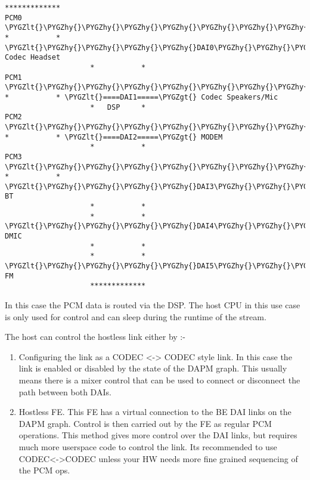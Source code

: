\documentclass[a4paper,8pt,english]{sphinxmanual}
\def\PYGZlt{\char`\<}
\def\PYGZgt{\char`\>}
\def\PYGZhy{\char`\-}
\begin{document}
\begin{Verbatim}[commandchars=\\\{\}]
                    *************
PCM0 \PYGZlt{}\PYGZhy{}\PYGZhy{}\PYGZhy{}\PYGZhy{}\PYGZhy{}\PYGZhy{}\PYGZhy{}\PYGZhy{}\PYGZhy{}\PYGZhy{}\PYGZhy{}\PYGZhy{}\PYGZgt{} *           * \PYGZlt{}\PYGZhy{}\PYGZhy{}\PYGZhy{}\PYGZhy{}DAI0\PYGZhy{}\PYGZhy{}\PYGZhy{}\PYGZhy{}\PYGZhy{}\PYGZgt{} Codec Headset
                    *           *
PCM1 \PYGZlt{}\PYGZhy{}\PYGZhy{}\PYGZhy{}\PYGZhy{}\PYGZhy{}\PYGZhy{}\PYGZhy{}\PYGZhy{}\PYGZhy{}\PYGZhy{}\PYGZhy{}\PYGZhy{}\PYGZgt{} *           * \PYGZlt{}====DAI1=====\PYGZgt{} Codec Speakers/Mic
                    *   DSP     *
PCM2 \PYGZlt{}\PYGZhy{}\PYGZhy{}\PYGZhy{}\PYGZhy{}\PYGZhy{}\PYGZhy{}\PYGZhy{}\PYGZhy{}\PYGZhy{}\PYGZhy{}\PYGZhy{}\PYGZhy{}\PYGZgt{} *           * \PYGZlt{}====DAI2=====\PYGZgt{} MODEM
                    *           *
PCM3 \PYGZlt{}\PYGZhy{}\PYGZhy{}\PYGZhy{}\PYGZhy{}\PYGZhy{}\PYGZhy{}\PYGZhy{}\PYGZhy{}\PYGZhy{}\PYGZhy{}\PYGZhy{}\PYGZhy{}\PYGZgt{} *           * \PYGZlt{}\PYGZhy{}\PYGZhy{}\PYGZhy{}\PYGZhy{}DAI3\PYGZhy{}\PYGZhy{}\PYGZhy{}\PYGZhy{}\PYGZhy{}\PYGZgt{} BT
                    *           *
                    *           * \PYGZlt{}\PYGZhy{}\PYGZhy{}\PYGZhy{}\PYGZhy{}DAI4\PYGZhy{}\PYGZhy{}\PYGZhy{}\PYGZhy{}\PYGZhy{}\PYGZgt{} DMIC
                    *           *
                    *           * \PYGZlt{}\PYGZhy{}\PYGZhy{}\PYGZhy{}\PYGZhy{}DAI5\PYGZhy{}\PYGZhy{}\PYGZhy{}\PYGZhy{}\PYGZhy{}\PYGZgt{} FM
                    *************
\end{Verbatim}

In this case the PCM data is routed via the DSP. The host CPU in this use case
is only used for control and can sleep during the runtime of the stream.

The host can control the hostless link either by :-
\begin{enumerate}
\item {} 
Configuring the link as a CODEC \textless{}-\textgreater{} CODEC style link. In this case the link
is enabled or disabled by the state of the DAPM graph. This usually means
there is a mixer control that can be used to connect or disconnect the path
between both DAIs.

\item {} 
Hostless FE. This FE has a virtual connection to the BE DAI links on the DAPM
graph. Control is then carried out by the FE as regular PCM operations.
This method gives more control over the DAI links, but requires much more
userspace code to control the link. Its recommended to use CODEC\textless{}-\textgreater{}CODEC
unless your HW needs more fine grained sequencing of the PCM ops.

\end{enumerate}
\end{document}
